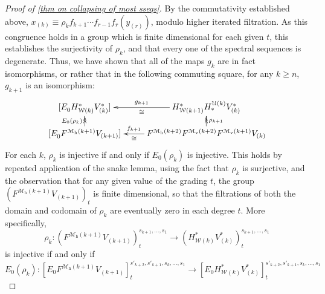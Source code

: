 \documentclass[11pt]{amsart} \renewcommand{\baselinestretch}{1.4}
\theoremstyle{plain}
\theoremstyle{definition}
\renewcommand{\to}{\longrightarrow}
\newcommand{\calU}{\mathcal{U}}
\newcommand{\calw}{\mathcal{W}}
\newcommand{\calMv}{\mathcal{M}\dver}
\newcommand{\calMh}{\mathcal{M}\dhor}
\newcommand{\UEAX}{\bar{X}'}%
\newcommand{\E}[5]{[E^{#1}_{#2}#3]^{#4}_{#5}}
\newcommand{\dver}{_\mathrm{v}}
\newcommand{\dhor}{_\mathrm{h}}
\begin{document}
\begin{Calculations of HWn for n nonzero}
\begin{proof}[Proof of \ref{thm on collapsing of most sseqs}]
By the commutativity established above, $x_{(k)}\equiv\rho_{k}f_{k+1}\cdots f_{r-1}f_r(y_{(r)})$, modulo higher iterated filtration. As this congruence holds in a group which is finite dimensional for each given $t$, this establishes the surjectivity of $\rho_k$, and that
%
%
%
every one of the spectral sequences is degenerate. Thus, we have shown that all of the maps $g_k$ are in fact isomorphisms, or rather that in the following commuting square, for any $k\geq n$,  $g_{k+1}$ is an isomorphism:
\[\xymatrix@R=4mm{
\E{}{0}{H^*_{\calw(k)}V^*_{(k)}}{}{}
&H^*_{\calw(k+1)}H_*^{\calU(k)}V^*_{(k)}\ar@{->}[l]^-{\cong}_-{{g}_{k+1}}
\\
\E{}{0}{F^{\calMh(k+1)}V_{(k+1)}}{}{}\ar@{->>}[u]^-{E_0(\rho_k)}
&F^{\calMh(k+2)}F^{\calMv(k+2)}F^{\calMv(k+1)}V_{(k)}\ar@{->}[l]^-{\cong}_-{{f}_{k+1}}\ar@{->>}[u]_-{\rho_{k+1}}
}\]
For each $k$, $\rho_k$ is injective if and only if $E_0(\rho_k)$ is injective. This holds by repeated application of the snake lemma, using the fact that $\rho_k$ is surjective, and the observation that for any given value of the grading $t$, the group $(F^{\calMh(k+1)}V_{(k+1)})_t$ is finite dimensional, so that the filtrations of both the domain and codomain of $\rho_k$ are eventually zero in each degree $t$. More specifically,
\[\rho_k:(F^{\calMh(k+1)}V_{(k+1)})_t^{s_{k+1},\ldots,s_1}\to (H^*_{\calw(k)}V^*_{(k)})_t^{s_{k+1},\ldots,s_1}\]
is injective if and only if
\[E_0(\rho_k):
\E{}{0}{F^{\calMh(k+1)}V_{(k+1)}}{s'_{k+2},s'_{k+1},s_k,\ldots,s_1}{t}
\to \E{}{0}{H^*_{\calw(k)}V^*_{(k)}}{s'_{k+2},s'_{k+1},s_k,\ldots,s_1}{t}\]

\end{proof}
\end{Calculations of HWn for n nonzero}
\end{document}
